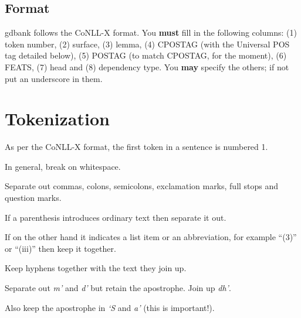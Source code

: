 \documentclass[a4paper]{article}
\begin{document}
\subsection{Format}

 gdbank follows the CoNLL-X format.
You \textbf{must} fill in the following columns: (1) token number, (2) surface, (3) lemma, (4) CPOSTAG (with the Universal POS tag detailed below), (5) POSTAG (to match CPOSTAG, for the moment), (6) FEATS, (7) head and (8) dependency type.
You \textbf{may} specify the others; if not put an underscore in them.

\section{Tokenization}

\newcommand{\ADV}{\texttt{ADV}}
\newcommand{\NOUN}{\texttt{NOUN}}
\newcommand{\PRT}{\texttt{PRT}}
\newcommand{\ROOT}{\texttt{ROOT}}
\newcommand{\VERB}{\texttt{VERB}}
\newcommand{\deter}{\texttt{det}}
\newcommand{\adpmod}{\texttt{adpmod}}
\newcommand{\adpobj}{\texttt{adpobj}}
\newcommand{\advmod}{\texttt{advmod}}
\newcommand{\appos}{\texttt{appos}}
\newcommand{\cc}{\texttt{cc}}
\newcommand{\ccomp}{\texttt{ccomp}}
\newcommand{\conj}{\texttt{conj}}
\newcommand{\dobj}{\texttt{dobj}}
\newcommand{\marker}{\texttt{mark}}
\newcommand{\nmod}{\texttt{nmod}}
\newcommand{\nsubj}{\texttt{nsubj}}
\newcommand{\p}{\texttt{p}}
\newcommand{\prt}{\texttt{prt}}
\newcommand{\rcmod}{\texttt{rcmod}}
\newcommand{\rel}{\texttt{rel}}

 As per the CoNLL-X format, the first token in a sentence is numbered 1. 

 In general, break on whitespace.

 Separate out commas, colons, semicolons, exclamation marks, full stops and question marks.

 If a parenthesis introduces ordinary text then separate it out.

 If on the other hand it indicates a list item or an abbreviation, for example ``(3)'' or ``(iii)'' then keep it together.

 Keep hyphens together with the text they join up.

 Separate out \textit{m'} and \textit{d'} but retain the apostrophe. Join up \textit{dh'}.

 Also keep the apostrophe in \textit{`S} and \textit{a'} (this is important!).
\end{document}
